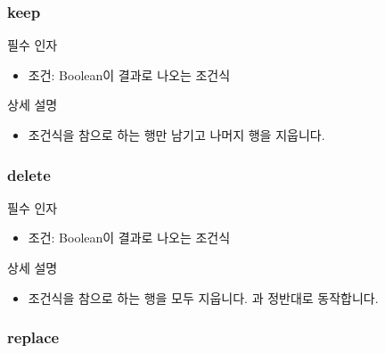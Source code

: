 \documentclass[letterpaper,10pt,english]{sphinxmanual}
\begin{document}
\subsubsection{keep}
\label{\detokenize{discovery/part07/rule_kinds:keep}}
필수 인자
\begin{itemize}
\item {} 
조건: Boolean이 결과로 나오는 조건식

\end{itemize}

상세 설명
\begin{itemize}
\item {} 
조건식을 참으로 하는 행만 남기고 나머지 행을 지웁니다.
\begin{quote}

\begin{figure}[H]
\centering

\noindent{}
\end{figure}
\end{quote}

\end{itemize}


\subsubsection{delete}
\label{\detokenize{discovery/part07/rule_kinds:delete}}
필수 인자
\begin{itemize}
\item {} 
조건: Boolean이 결과로 나오는 조건식

\end{itemize}

상세 설명
\begin{itemize}
\item {} 
조건식을 참으로 하는 행을 모두 지웁니다. {\hyperref[\detokenize{discovery/part07/rule_kinds:keep}]{}}과 정반대로 동작합니다.

\end{itemize}


\subsubsection{replace}
\label{\detokenize{discovery/part07/rule_kinds:replace}}
\begin{figure}[H]
\centering

\noindent{}
\end{figure}
\end{document}
